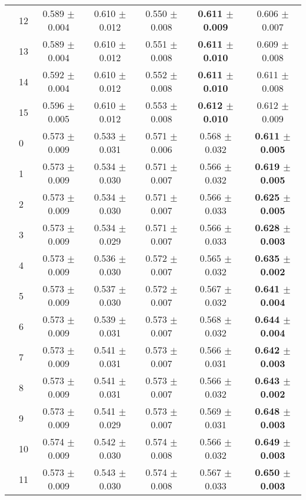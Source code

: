 \begin{table*}[t]
{\begin{tabular}{ll c c c c c}
        & 12 & 0.589 $\pm$ 0.004 & 0.610 $\pm$ 0.012 & 0.550 $\pm$ 0.008 & \textbf{0.611 $\pm$ 0.009} & 0.606 $\pm$ 0.007 \\
        & 13 & 0.589 $\pm$ 0.004 & 0.610 $\pm$ 0.012 & 0.551 $\pm$ 0.008 & \textbf{0.611 $\pm$ 0.010} & 0.609 $\pm$ 0.008 \\
        & 14 & 0.592 $\pm$ 0.004 & 0.610 $\pm$ 0.012 & 0.552 $\pm$ 0.008 & \textbf{0.611 $\pm$ 0.010} & 0.611 $\pm$ 0.008 \\
        & 15 & 0.596 $\pm$ 0.005 & 0.610 $\pm$ 0.012 & 0.553 $\pm$ 0.008 & \textbf{0.612 $\pm$ 0.010} & 0.612 $\pm$ 0.009 \\
\midrule
\assist{} & 0 & 0.573 $\pm$ 0.009 & 0.533 $\pm$ 0.031 & 0.571 $\pm$ 0.006 & 0.568 $\pm$ 0.032 & \textbf{0.611 $\pm$ 0.005} \\
        & 1 & 0.573 $\pm$ 0.009 & 0.534 $\pm$ 0.030 & 0.571 $\pm$ 0.007 & 0.566 $\pm$ 0.032 & \textbf{0.619 $\pm$ 0.005} \\
        & 2 & 0.573 $\pm$ 0.009 & 0.534 $\pm$ 0.030 & 0.571 $\pm$ 0.007 & 0.566 $\pm$ 0.033 & \textbf{0.625 $\pm$ 0.005} \\
        & 3 & 0.573 $\pm$ 0.009 & 0.534 $\pm$ 0.029 & 0.571 $\pm$ 0.007 & 0.566 $\pm$ 0.033 & \textbf{0.628 $\pm$ 0.003} \\
        & 4 & 0.573 $\pm$ 0.009 & 0.536 $\pm$ 0.030 & 0.572 $\pm$ 0.007 & 0.565 $\pm$ 0.032 & \textbf{0.635 $\pm$ 0.002} \\
        & 5 & 0.573 $\pm$ 0.009 & 0.537 $\pm$ 0.030 & 0.572 $\pm$ 0.007 & 0.567 $\pm$ 0.032 & \textbf{0.641 $\pm$ 0.004} \\
        & 6 & 0.573 $\pm$ 0.009 & 0.539 $\pm$ 0.031 & 0.573 $\pm$ 0.007 & 0.568 $\pm$ 0.032 & \textbf{0.644 $\pm$ 0.004} \\
        & 7 & 0.573 $\pm$ 0.009 & 0.541 $\pm$ 0.031 & 0.573 $\pm$ 0.007 & 0.566 $\pm$ 0.031 & \textbf{0.642 $\pm$ 0.003} \\
        & 8 & 0.573 $\pm$ 0.009 & 0.541 $\pm$ 0.031 & 0.573 $\pm$ 0.007 & 0.566 $\pm$ 0.032 & \textbf{0.643 $\pm$ 0.002} \\
        & 9 & 0.573 $\pm$ 0.009 & 0.541 $\pm$ 0.029 & 0.573 $\pm$ 0.007 & 0.569 $\pm$ 0.031 & \textbf{0.648 $\pm$ 0.003} \\
        & 10 & 0.574 $\pm$ 0.009 & 0.542 $\pm$ 0.030 & 0.574 $\pm$ 0.008 & 0.566 $\pm$ 0.032 & \textbf{0.649 $\pm$ 0.003} \\
        & 11 & 0.573 $\pm$ 0.009 & 0.543 $\pm$ 0.030 & 0.574 $\pm$ 0.008 & 0.567 $\pm$ 0.033 & \textbf{0.650 $\pm$ 0.003} \\

\end{tabular}}
\end{table*}
